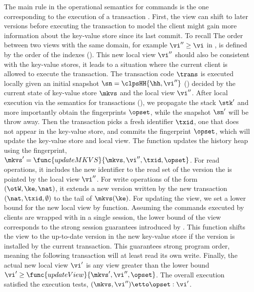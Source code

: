 The main rule in the operational semantics for commands is the one corresponding to the execution of a transaction .
First, the view can shift to later versions before executing the transaction to model the client might gain more information about the key-value store since its last commit.
To recall The order between two views with the same domain, for example \( \vi'' \geq \vi \) in , is defined by the order of the indexes ().
This new local view \( \vi'' \) should also be consistent with the key-value stores, \ie it leads to a situation where the current client is allowed to execute the transaction.
The transaction code \( \trans \) is executed locally given an initial snapshot \( \sn = \clpsHH{\hh, \vi''}\) () decided by the current state of key-value store \( \mkvs \) and the local view \( \vi'' \).
After local execution via the semantics for transactions (), we propagate the stack \( \stk' \) and more importantly obtain the fingerprints \( \opset \), while the snapshot \( \sn' \) will be throw away.
Then the transaction picks a fresh identifier \( \txid \), \ie one that does not appear in the key-value store, and commits the fingerprint \( \opset \), which will update the key-value store and local view.
The  function updates the history heap using the fingerprint, \( \mkvs' = \func{updateMKVS}{\mkvs,\vi'',\txid, \opset}\).
For read operations, it includes the new identifier to the read set of the version the is pointed by the local view \( \vi''\).
For write operations of the form \( (\otW, \ke, \nat) \), it extends a new version written by the new transaction \( (\nat, \txid, \emptyset) \) to the tail of \( \mkvs(\ke) \).
For updating the view, we set a lower bound for the new local view by  function.
Assuming the commands executed by clients are wrapped with in a single session, the lower bound of the view corresponds to the strong session guarantees introduced by \cite{.........}.
This function shifts the view to the up-to-date version in the new key-value store if the version is installed by the current transaction.
This guarantees strong program order, meaning the following transaction will at least read its own write.
Finally, the actual new local view \( \vi' \) is any view greater than the lower bound \( \vi' \geq \func{updateView}{\mkvs', \vi'', \opset}\).
The overall execution satisfied the execution tests, \ie \( (\mkvs, \vi'') \etto \opset : \vi'\).

